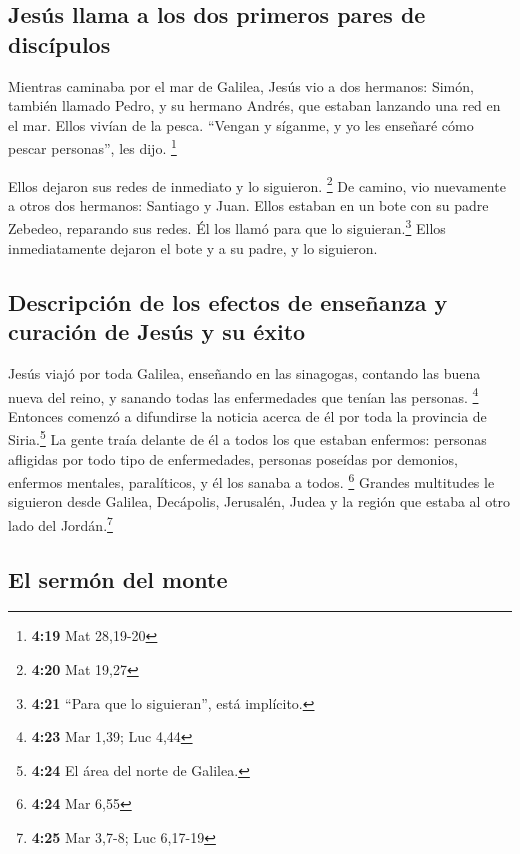 \hypertarget{jesuxfas-llama-a-los-dos-primeros-pares-de-discuxedpulos}{%
\subsection{Jesús llama a los dos primeros pares de
discípulos}\label{jesuxfas-llama-a-los-dos-primeros-pares-de-discuxedpulos}}

 Mientras caminaba por el mar de Galilea, Jesús vio a dos
hermanos: Simón, también llamado Pedro, y su hermano Andrés, que estaban
lanzando una red en el mar. Ellos vivían de la pesca. 
``Vengan y síganme, y yo les enseñaré cómo pescar personas'', les dijo.
\footnote{\textbf{4:19} Mat 28,19-20}

 Ellos dejaron sus redes de inmediato y lo siguieron.
\footnote{\textbf{4:20} Mat 19,27}  De camino, vio
nuevamente a otros dos hermanos: Santiago y Juan. Ellos estaban en un
bote con su padre Zebedeo, reparando sus redes. Él los llamó para que lo
siguieran.\footnote{\textbf{4:21} ``Para que lo siguieran'', está
  implícito.}  Ellos inmediatamente dejaron el bote y a
su padre, y lo siguieron.

\hypertarget{descripciuxf3n-de-los-efectos-de-enseuxf1anza-y-curaciuxf3n-de-jesuxfas-y-su-uxe9xito}{%
\subsection{Descripción de los efectos de enseñanza y curación de Jesús
y su
éxito}\label{descripciuxf3n-de-los-efectos-de-enseuxf1anza-y-curaciuxf3n-de-jesuxfas-y-su-uxe9xito}}

 Jesús viajó por toda Galilea, enseñando en las
sinagogas, contando las buena nueva del reino, y sanando todas las
enfermedades que tenían las personas. \footnote{\textbf{4:23} Mar 1,39;
  Luc 4,44}  Entonces comenzó a difundirse la noticia
acerca de él por toda la provincia de Siria.\footnote{\textbf{4:24} El
  área del norte de Galilea.} La gente traía delante de él a todos los
que estaban enfermos: personas afligidas por todo tipo de enfermedades,
personas poseídas por demonios, enfermos mentales, paralíticos, y él los
sanaba a todos. \footnote{\textbf{4:24} Mar 6,55} 
Grandes multitudes le siguieron desde Galilea, Decápolis, Jerusalén,
Judea y la región que estaba al otro lado del Jordán.\footnote{\textbf{4:25}
  Mar 3,7-8; Luc 6,17-19}

\hypertarget{el-sermuxf3n-del-monte}{%
\subsection{El sermón del monte}\label{el-sermuxf3n-del-monte}}

